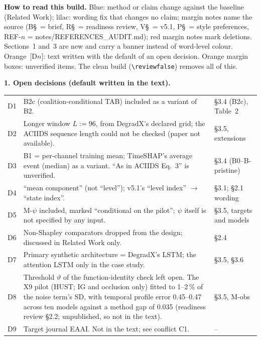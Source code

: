 \begin{reviewnotes}
\textbf{How to read this build.} \textcolor{revclaim}{Blue}: method or claim change against the baseline (Related Work); \textcolor{revword}{lilac}: wording fix that changes no claim; margin notes name the source (B\S\ = brief, R\S\ = readiness review, V\S\ = v5.1, P\S\ = style preferences, REF-$n$ = notes/REFERENCES\_AUDIT.md); red margin notes mark deletions. Sections~1 and~3 are new and carry a banner instead of word-level colour. \textcolor{revdec}{Orange}~[D$n$]: text written with the default of an open decision. Orange margin boxes: unverified items. The clean build (\verb|\reviewfalse|) removes all of this.

\medskip\textbf{1. Open decisions (default written in the text).}\\[1pt]
\begin{tabularx}{\linewidth}{@{}l>{\raggedright\arraybackslash}X>{\raggedright\arraybackslash}p{3.2cm}@{}}
D1 & B2c (coalition-conditional TAB) included as a variant of B2. & \S3.4 (B2c), Table~2 \\
D2 & Longer window $L:=96$, from DegradX's declared grid; the ACIIDS sequence length could not be checked (paper not available). & \S3.5, extensions \\
D3 & B1 = per-channel training mean; TimeSHAP's average event (median) as a variant. ``As in ACIIDS Eq.~3'' is unverified. & \S3.4 (B0--B-pristine) \\
D4 & ``mean component'' (not ``level''); v5.1's ``level index'' $\to$ ``state index''. & \S3.1; \S2.1 wording \\
D5 & M-$\psi$ included, marked ``conditional on the pilot''; $\psi$ itself is not specified by any input. & \S3.5, targets and models \\
D6 & Non-Shapley comparators dropped from the design; discussed in Related Work only. & \S2.4 \\
D7 & Primary synthetic architecture = DegradX's LSTM; the attention LSTM only in the case study. & \S3.5, \S3.6 \\
D8 & Threshold $\vartheta$ of the function-identity check left open. The X9 pilot (HUST; IG and occlusion only) fitted to 1--2\,\% of the noise term's SD, with temporal profile error 0.45--0.47 across ten models against a method gap of 0.035 (readiness review \S2.2; unpublished, so not in the text). & \S3.5, M-obs \\
D9 & Target journal EAAI. Not in the text; see conflict C1. & -- \\
\end{tabularx}


\end{reviewnotes}

